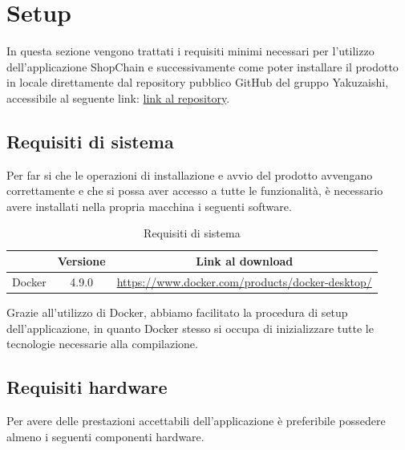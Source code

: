 \section{Setup}\label{section:setup}

In questa sezione vengono trattati i requisiti minimi necessari per l'utilizzo dell'applicazione ShopChain e successivamente come poter installare il prodotto in locale direttamente dal repository\glo
pubblico GitHub\glo{} del gruppo Yakuzaishi, accessibile al seguente link: \href{https://yakuzaishi-swe.github.io}{link al repository}.

\subsection{Requisiti di sistema}

Per far si che le operazioni di installazione e avvio del prodotto avvengano correttamente e che si possa
aver accesso a tutte le funzionalità, è necessario avere installati nella propria macchina i seguenti software.

\begin{table}[H]
	\centering
	\renewcommand{\arraystretch}{1.8}
    \begin{tabular}{c | c | c}
		\rowcolor[HTML]{125E28}
		\multicolumn{1}{c}{\color[HTML]{FFFFFF} \textbf{Software}} &
        \multicolumn{1}{c}{\color[HTML]{FFFFFF} \textbf{Versione}} & 
		\multicolumn{1}{c}{\color[HTML]{FFFFFF} \textbf{Link al download}}   \\ \hline
        Docker & 4.9.0 & \href{https://www.docker.com/products/docker-desktop/}{https://www.docker.com/products/docker-desktop/} \\ \hline
    \end{tabular}
    \caption{Requisiti di sistema}
\end{table}

Grazie all'utilizzo di Docker\glo{}, abbiamo facilitato la procedura di setup dell'applicazione, in quanto Docker stesso si occupa di inizializzare tutte le tecnologie necessarie alla compilazione.

\subsection{Requisiti hardware}

Per avere delle prestazioni accettabili dell'applicazione è preferibile possedere almeno i seguenti componenti hardware.

